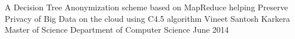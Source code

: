 \documentclass[dvips,letterpaper,12pt]{report}
\begin{document}

\thesistitle
	{A Decision Tree Anonymization scheme based on MapReduce helping Preserve Privacy  of Big Data on the cloud using C4.5 algorithm}
	{Vineet Santosh Karkera}
	{Master of Science}
	{Department of Computer Science}
	{June 2014}
















\appendix

\end{document}
